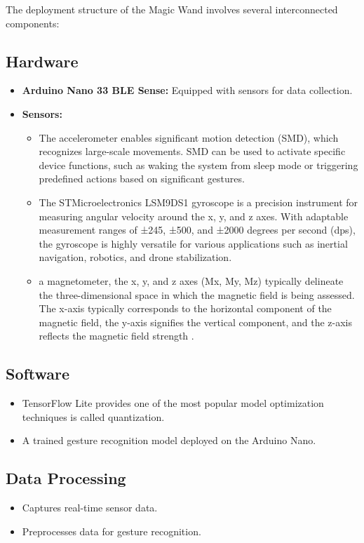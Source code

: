 The deployment structure of the Magic Wand involves several interconnected components:

\subsection{Hardware}
\begin{itemize}
	\item \textbf{Arduino Nano 33 BLE Sense:} Equipped with sensors for data collection.
	\item \textbf{Sensors:}
	\begin{itemize}
		\item The accelerometer enables significant motion detection (SMD), which recognizes large-scale movements. SMD can be used to activate specific device functions, such as waking the system from sleep mode or triggering predefined actions based on significant gestures.\cite{Zhou:2020}
		\item The STMicroelectronics LSM9DS1 gyroscope is a precision instrument for measuring angular velocity around the x, y, and z axes. With adaptable measurement ranges of ±245, ±500, and ±2000 degrees per second (dps), the gyroscope is highly versatile for various applications such as inertial navigation, robotics, and drone stabilization.\cite{St:2024}
		\item a magnetometer, the x, y, and z axes (Mx, My, Mz) typically delineate the three-dimensional space in which the magnetic field is being assessed. The x-axis typically corresponds to the horizontal component of the magnetic field, the y-axis signifies the vertical component, and the z-axis reflects the magnetic field strength \cite{Kostiainen:2023}.
	\end{itemize}
\end{itemize}

\subsection{Software}
\begin{itemize}
	\item TensorFlow Lite provides one of the most popular model optimization techniques is called quantization.\cite{tensorflowlite:2025}
	\item A trained gesture recognition model deployed on the Arduino Nano.
\end{itemize}

\subsection{Data Processing}
\begin{itemize}
	\item Captures real-time sensor data.
	\item Preprocesses data for gesture recognition.
\end{itemize}

